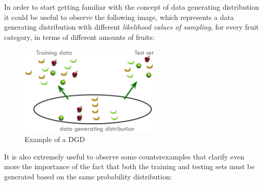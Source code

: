 \vspace{5mm}

In order to start getting familiar with the concept of data generating
distribution it could be useful to observe the following image, which
represents a data generating distribution with different
\emph{likelihood values of sampling}, for every fruit category,
in terms of different amounts of fruits:

\newpage

\begin{figure}[h]
      \centering
      \includegraphics[width=0.6\textwidth]{../img/DGD_example}
      \caption{Example of a DGD}
\end{figure}

\vspace{5mm}

It is also extremely useful to observe some counterexamples that
clarify even more the importance of the fact that both the training
and testing sets must be generated based on the same probability
distribution:

\vspace{5mm}

